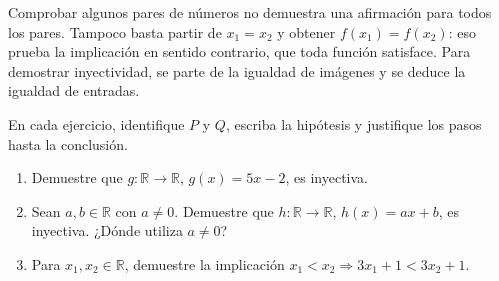 \documentclass[10pt,a5paper]{article}
\newif\ifmostrarSoluciones
\begin{document}
\begin{nota}
Comprobar algunos pares de números no demuestra una afirmación para todos los pares. Tampoco basta partir de $x_1=x_2$ y obtener $f(x_1)=f(x_2)$: eso prueba la implicación en sentido contrario, que toda función satisface. Para demostrar inyectividad, se parte de la igualdad de imágenes y se deduce la igualdad de entradas.
\end{nota}

\begin{ejercicios}
En cada ejercicio, identifique $P$ y $Q$, escriba la hipótesis y justifique los pasos hasta la conclusión.
\begin{enumerate}
  \item Demuestre que $g:\mathbb{R}\to\mathbb{R}$, $g(x)=5x-2$, es inyectiva.
  \item Sean $a,b\in\mathbb{R}$ con $a\neq0$. Demuestre que $h:\mathbb{R}\to\mathbb{R}$, $h(x)=ax+b$, es inyectiva. ¿Dónde utiliza $a\neq0$?
  \item Para $x_1,x_2\in\mathbb{R}$, demuestre la implicación $x_1<x_2\Longrightarrow3x_1+1<3x_2+1$.
\end{enumerate}
\end{ejercicios}
\ifmostrarSoluciones
\begin{solucion}[de los ejercicios]
\begin{enumerate}
  \item Sean $x_1,x_2\in\mathbb{R}$. Si $g(x_1)=g(x_2)$, entonces $5x_1-2=5x_2-2$. Sumando $2$ y dividiendo entre $5$, obtenemos $x_1=x_2$; luego $g$ es inyectiva.
  \item Sean $x_1,x_2\in\mathbb{R}$. Si $h(x_1)=h(x_2)$, entonces $ax_1+b=ax_2+b$. Restamos $b$ y dividimos entre $a$, operación válida porque $a\neq0$. Resulta $x_1=x_2$; luego $h$ es inyectiva.
  \item Sean $x_1,x_2\in\mathbb{R}$ y supongamos $x_1<x_2$. Multiplicar por $3>0$ conserva la desigualdad: $3x_1<3x_2$. Sumar $1$ en ambos miembros da $3x_1+1<3x_2+1$, como se quería demostrar.
\end{enumerate}
\end{solucion}
\fi
\end{document}
